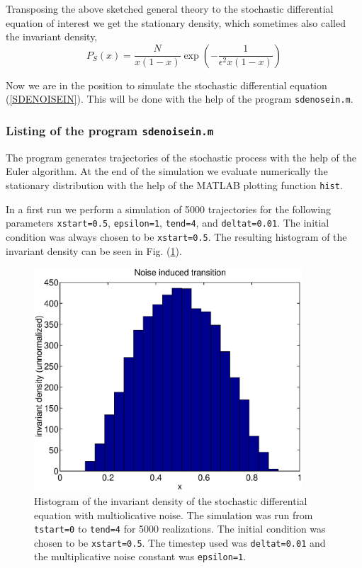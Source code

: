Transposing the above sketched general theory to the stochastic 
differential equation of interest  we get the stationary density,
which sometimes also called the invariant density,
\begin{equation*}
P_S(x) = \frac{N}{x(1-x)} \exp\left( - \frac{1}
           {\epsilon^2 x(1-x)}\right)
\end{equation*}

Now we are in the position to simulate the stochastic differential
equation (\ref{SDENOISEIN}). This will be done with the help of 
the program \texttt{sdenosein.m}.

\subsubsection{Listing of the program \texttt{sdenoisein.m}}
The program generates trajectories of the stochastic process with 
the help of the Euler algorithm. At the end of the simulation we evaluate 
numerically the stationary distribution with the help
of the MATLAB plotting function \texttt{hist}.

In a first run we perform a simulation of 5000 trajectories for 
the following parameters \texttt{xstart=0.5}, \texttt{epsilon=1},
\texttt{tend=4}, and \texttt{deltat=0.01}. The initial condition
was always chosen to be \texttt{xstart=0.5}. The resulting histogram
of the invariant density can be seen in Fig. 
(\ref{F_SDENOISEIN_1}).

\begin{figure}
\label{F_SDENOISEIN_1}
\includegraphics[width=10cm]{./Figures/f_sdenoisein_1.eps}
\caption{Histogram of the invariant density of the stochastic differential 
equation with multiolicative noise. The simulation was run from
\texttt{tstart=0} to \texttt{tend=4} for 5000 realizations.
The initial condition was chosen to be \texttt{xstart=0.5}.
The timestep used was \texttt{deltat=0.01} and the multiplicative noise 
constant was \texttt{epsilon=1}.} 
\end{figure}

